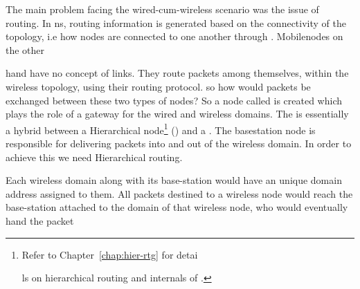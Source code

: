 {The main problem facing the wired-cum-wireless scenario was the issue of routing. In ns, routing information is generated based on the connectivity of the topology, i.e how nodes are connected to one another through . Mobilenodes on the other 






















hand have no concept of links. They route packets among themselves, within the wireless topology, using their routing protocol. so how would packets be exchanged between these two types of nodes?
So a node called  is created which plays the role of a gateway for the wired and wireless domains. The  is essentially a hybrid between a Hierarchical node\footnote{Refer to Chapter~\ref{chap:hier-rtg} for detai






















ls on hierarchical routing and internals of .} () and a . The basestation node is responsible for delivering packets into and out of the wireless domain. In order to achieve this we need Hierarchical routing.






















 Each wireless domain along with its base-station would have an unique domain address assigned to them. All packets destined to a wireless node would reach the base-station attached to the domain of that wireless node, who would eventually hand the packet






















}
